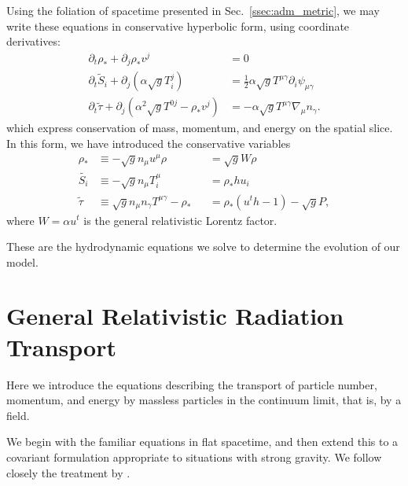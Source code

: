 Using the foliation of spacetime presented in Sec.~\ref{ssec:adm_metric}, we may
write these equations in conservative hyperbolic form,
using coordinate derivatives:
\begin{align}
  \label{eqn:adm_hydro_mass}
  \partial_t \rho_* + \partial_j \rho_* v^j &= 0 \\
  \label{eqn:adm_hydro_mom}
  \partial_t \tilde{S}_i + \partial_j(\alpha\sqrt{g}T^j_i) &=
  \frac{1}{2}\alpha\sqrt{g}T^{\mu\gamma}\partial_i\psi_{\mu\gamma} \\
  \label{eqn:adm_hydro_ener}
  \partial_t \tilde{\tau} + \partial_j(\alpha^2\sqrt{g}T^{0j}-\rho_*v^j) &=
  -\alpha\sqrt{g}T^{\mu\gamma}\nabla_\mu n_\gamma.
\end{align}
which express conservation of mass, momentum, and energy on the spatial slice.
In this form, we have introduced the conservative variables
\begin{align}
  \label{eqn:rhostar}
  \rho_*       &\equiv -\sqrt{g} n_\mu u^\mu \rho &&= \sqrt{g}W\rho \\
  \label{eqn:tildeS}
  \tilde{S_i}  &\equiv -\sqrt{g} n_\mu T^\mu_i    &&= \rho_* h u_i \\
  \label{eqn:tildetau}
  \tilde{\tau} &\equiv  \sqrt{g} n_\mu n_\gamma T^{\mu\gamma} - \rho_*
  &&= \rho_*(u^t h-1)-\sqrt{g}P,
\end{align}
where $W=\alpha u^t$ is the general relativistic Lorentz factor.

These are the hydrodynamic equations we solve to determine the evolution of
our model.

\section{General Relativistic Radiation Transport}
\label{sec:rad_transport}
Here we introduce the equations describing the transport of particle number,
momentum, and energy by massless particles in the continuum limit, that is,
by a field.

We begin with the familiar equations in flat spacetime, and then extend this
to a covariant formulation appropriate to situations with strong gravity.
We follow closely the treatment by \citet{miha1999-foundations}.

